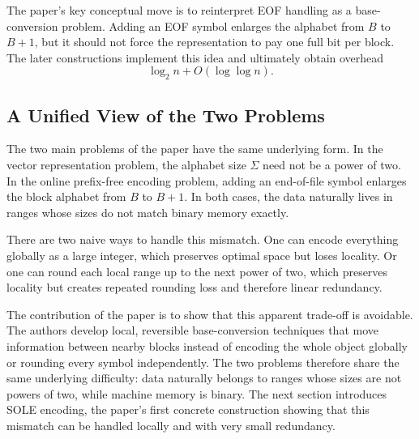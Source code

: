 The paper's key conceptual move is to reinterpret EOF handling as a base-conversion problem. Adding an EOF symbol enlarges the alphabet from \(B\) to \(B+1\), but it should not force the representation to pay one full bit per block. The later constructions implement this idea and ultimately obtain overhead
\[
    \log_2 n + O(\log\log n).
\]

\subsection{A Unified View of the Two Problems}

The two main problems of the paper have the same underlying form. In the vector representation problem, the alphabet size \(\Sigma\) need not be a power of two. In the online prefix-free encoding problem, adding an end-of-file symbol enlarges the block alphabet from \(B\) to \(B+1\). In both cases, the data naturally lives in ranges whose sizes do not match binary memory exactly.

There are two naive ways to handle this mismatch. One can encode everything globally as a large integer, which preserves optimal space but loses locality. Or one can round each local range up to the next power of two, which preserves locality but creates repeated rounding loss and therefore linear redundancy.

The contribution of the paper is to show that this apparent trade-off is avoidable. The authors develop local, reversible base-conversion techniques that move information between nearby blocks instead of encoding the whole object globally or rounding every symbol independently. The two problems therefore share the same underlying difficulty: data naturally belongs to ranges whose sizes are not powers of two, while machine memory is binary. The next section introduces SOLE encoding, the paper's first concrete construction showing that this mismatch can be handled locally and with very small redundancy.
